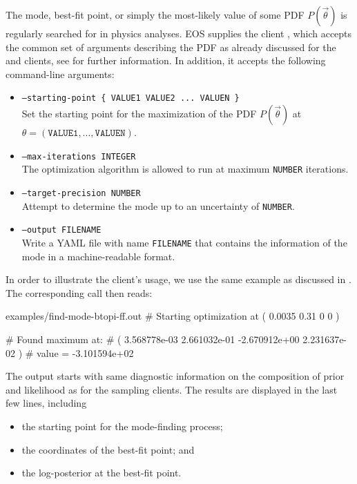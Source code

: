 The mode, best-fit point, or simply the most-likely value of some \gls{PDF}
$P(\vec\theta)$ is regularly searched for in physics analyses. EOS supplies the
client , which accepts the common set of arguments
describing the PDF as already discussed for the  and
 clients, see  for
further information.  In addition, it accepts the following command-line
arguments:
\begin{itemize}
    \item[] \texttt{--starting-point \{ VALUE1 VALUE2 ... VALUEN \}}\\[\medskipamount]
        Set the starting point for the maximization of the PDF $P(\vec\theta)$
        at $\theta = ( \texttt{VALUE1}, \dots, \texttt{VALUEN} )$.
    \item[] \texttt{--max-iterations INTEGER}\\[\medskipamount]
        The optimization algorithm is allowed to run at maximum \texttt{NUMBER} iterations.
    \item[] \texttt{--target-precision NUMBER}\\[\medskipamount]
        Attempt to determine the mode up to an uncertainty of \texttt{NUMBER}.
    \item[] \texttt{--output FILENAME}\\[\medskipamount]
        Write a YAML file with name \texttt{FILENAME} that contains the information of
        the mode in a machine-readable format.
\end{itemize}

In order to illustrate the client's usage, we use the same example as
discussed in . The corresponding call
then reads:

\begin{filecontents*}{examples/find-mode-btopi-ff.out}
# Starting optimization at ( 0.0035 0.31 0 0 )

# Found maximum at: 
#   ( 3.568778e-03 2.661032e-01 -2.670912e+00 2.231637e-02 )
#   value = -3.101594e+02
\end{filecontents*}
The output starts with same diagnostic information on the composition of
prior and likelihood as for the sampling clients. The results are displayed
in the last few lines, including
\begin{itemize}
    \item the starting point for the mode-finding process;
    \item the coordinates of the best-fit point; and
    \item the log-posterior at the best-fit point.
\end{itemize}

